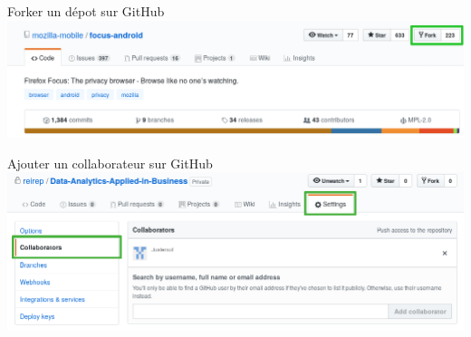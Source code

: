 \documentclass{beamer}
\begin{document}
\begin{frame}{Forker un dépot sur GitHub}
    \includegraphics[scale=0.30]{img/github_desktop/fork.png}
\end{frame}

\begin{frame}{Ajouter un collaborateur sur GitHub}
    \includegraphics[scale=0.33]{img/github_desktop/colaborator.png}
\end{frame}
\end{document}
